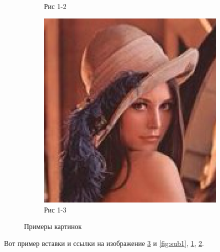 \begin{figure}[htbp]
\begin{subfigure}[b]{0.3\textwidth}
        \caption{Рис 1-2}
        \label{fig:sub2}
    \end{subfigure}
    \hfill 
    \begin{subfigure}[b]{0.3\textwidth}
        \includegraphics[width=\textwidth]{pic/pic} 
        \caption{Рис 1-3}
        \label{fig:sub3}
    \end{subfigure}
    \caption{Примеры картинок}
    \label{fig:total}
\end{figure}

Вот пример вставки и ссылки на изображение \ref{fig:total} и \ref{fig:sub1}, \ref{fig:sub2}, \ref{fig:sub3}.

